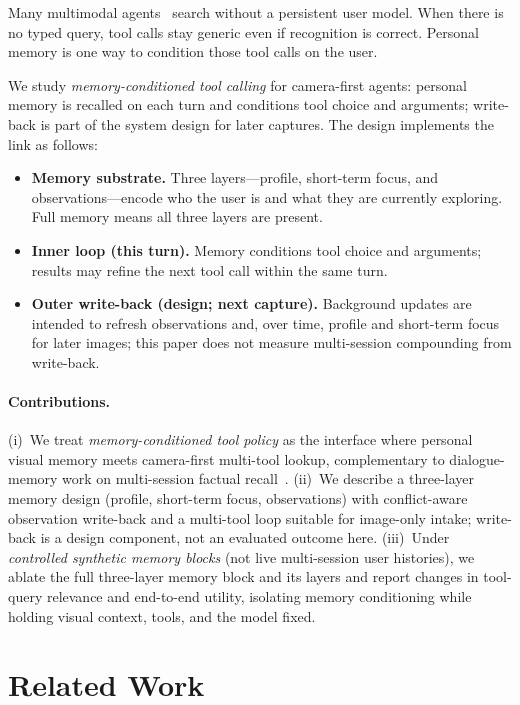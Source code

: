 \documentclass[11pt,a4paper]{article}
\begin{document}
Many multimodal agents~\cite{promsa,mta_agent,videosearcher} search without a persistent user model. When there is no typed query, tool calls stay generic even if recognition is correct. Personal memory is one way to condition those tool calls on the user.

We study \emph{memory-conditioned tool calling} for camera-first agents: personal memory is recalled on each turn and conditions tool choice and arguments; write-back is part of the system design for later captures. The design implements the link as follows:
\begin{itemize}[leftmargin=*]
    \item \textbf{Memory substrate.} Three layers---profile, short-term focus, and observations---encode who the user is and what they are currently exploring. Full memory means all three layers are present.
    \item \textbf{Inner loop (this turn).} Memory conditions tool choice and arguments; results may refine the next tool call within the same turn.
    \item \textbf{Outer write-back (design; next capture).} Background updates are intended to refresh observations and, over time, profile and short-term focus for later images; this paper does not measure multi-session compounding from write-back.
\end{itemize}

\paragraph{Contributions.}
(i)~We treat \emph{memory-conditioned tool policy} as the interface where personal visual memory meets camera-first multi-tool lookup, complementary to dialogue-memory work on multi-session factual recall~\cite{locomo,mem0}.
(ii)~We describe a three-layer memory design (profile, short-term focus, observations) with conflict-aware observation write-back and a multi-tool loop suitable for image-only intake; write-back is a design component, not an evaluated outcome here.
(iii)~Under \emph{controlled synthetic memory blocks} (not live multi-session user histories), we ablate the full three-layer memory block and its layers and report changes in tool-query relevance and end-to-end utility, isolating memory conditioning while holding visual context, tools, and the model fixed.

\section{Related Work}
\end{document}
